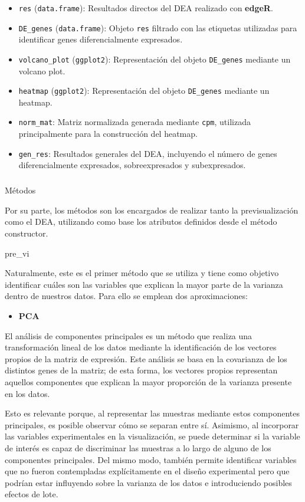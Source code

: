 \documentclass[
  9pt,
]{article}
\makeatletter
\let\oldsubparagraph\subparagraph
\renewcommand{\subparagraph}{
    \@ifstar
      \xxxSubParagraphStar
      \xxxSubParagraphNoStar
  }
\newcommand{\xxxSubParagraphStar}[1]{\oldsubparagraph*{#1}\mbox{}}
\newcommand{\xxxSubParagraphNoStar}[1]{\oldsubparagraph{#1}\mbox{}}
\providecommand{\tightlist}{%
  \setlength{\itemsep}{0pt}\setlength{\parskip}{0pt}}
\makeatother
\begin{document}
\begin{itemize}
  \begin{itemize}
  \item
    \texttt{res} (\texttt{data.frame}): Resultados directos del DEA
    realizado con \textbf{edgeR}.
  \item
    \texttt{DE\_genes} (\texttt{data.frame}): Objeto \texttt{res}
    filtrado con las etiquetas utilizadas para identificar genes
    diferencialmente expresados.
  \item
    \texttt{volcano\_plot} (\texttt{ggplot2}): Representación del objeto
    \texttt{DE\_genes} mediante un volcano plot.
  \item
    \texttt{heatmap} (\texttt{ggplot2}): Representación del objeto
    \texttt{DE\_genes} mediante un heatmap.
  \item
    \texttt{norm\_mat}: Matriz normalizada generada mediante
    \texttt{cpm}, utilizada principalmente para la construcción del
    heatmap.
  \item
    \texttt{gen\_res}: Resultados generales del DEA, incluyendo el
    número de genes diferencialmente expresados, sobreexpresados y
    subexpresados.
  \end{itemize}
\end{itemize}

\subparagraph{Métodos}\label{muxe9todos}

Por su parte, los métodos son los encargados de realizar tanto la
previsualización como el DEA, utilizando como base los atributos
definidos desde el método constructor.

pre\_vi

Naturalmente, este es el primer método que se utiliza y tiene como
objetivo identificar cuáles son las variables que explican la mayor
parte de la varianza dentro de nuestros datos. Para ello se emplean dos
aproximaciones:

\begin{itemize}
\tightlist
\item
  \textbf{PCA}
\end{itemize}

El análisis de componentes principales es un método que realiza una
transformación lineal de los datos mediante la identificación de los
vectores propios de la matriz de expresión. Este análisis se basa en la
covarianza de los distintos genes de la matriz; de esta forma, los
vectores propios representan aquellos componentes que explican la mayor
proporción de la varianza presente en los datos.

Esto es relevante porque, al representar las muestras mediante estos
componentes principales, es posible observar cómo se separan entre sí.
Asimismo, al incorporar las variables experimentales en la
visualización, se puede determinar si la variable de interés es capaz de
discriminar las muestras a lo largo de alguno de los componentes
principales. Del mismo modo, también permite identificar variables que
no fueron contempladas explícitamente en el diseño experimental pero que
podrían estar influyendo sobre la varianza de los datos e introduciendo
posibles efectos de lote.
\end{document}
